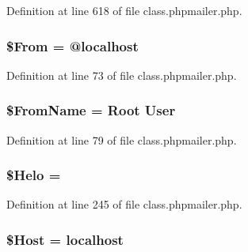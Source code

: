 Definition at line 618 of file class.\+phpmailer.\+php.

\subsubsection[{\texorpdfstring{\$\+From}{$From}}]{\setlength{\rightskip}{0pt plus 5cm}\$From = @localhost\textquotesingle{}}\hypertarget{class_p_h_p_mailer_a9f9e5bc6226feedebe3135b210eb5ef8}{}\label{class_p_h_p_mailer_a9f9e5bc6226feedebe3135b210eb5ef8}


Definition at line 73 of file class.\+phpmailer.\+php.

\subsubsection[{\texorpdfstring{\$\+From\+Name}{$FromName}}]{\setlength{\rightskip}{0pt plus 5cm}\$From\+Name = \textquotesingle{}Root User\textquotesingle{}}\hypertarget{class_p_h_p_mailer_a0338c56bfb2ac4229c555a97222f47c2}{}\label{class_p_h_p_mailer_a0338c56bfb2ac4229c555a97222f47c2}


Definition at line 79 of file class.\+phpmailer.\+php.

\subsubsection[{\texorpdfstring{\$\+Helo}{$Helo}}]{\setlength{\rightskip}{0pt plus 5cm}\$Helo = \textquotesingle{}\textquotesingle{}}\hypertarget{class_p_h_p_mailer_a361dc28dd21d5c555a1645bcdf8bab66}{}\label{class_p_h_p_mailer_a361dc28dd21d5c555a1645bcdf8bab66}


Definition at line 245 of file class.\+phpmailer.\+php.

\subsubsection[{\texorpdfstring{\$\+Host}{$Host}}]{\setlength{\rightskip}{0pt plus 5cm}\$Host = \textquotesingle{}localhost\textquotesingle{}}\hypertarget{class_p_h_p_mailer_ad019d6ecb4db4cd981fb7aeae7fbfc2c}{}\label{class_p_h_p_mailer_ad019d6ecb4db4cd981fb7aeae7fbfc2c}


